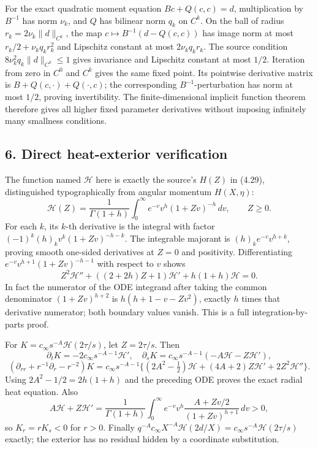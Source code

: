 \documentclass[10pt,a4paper]{article}
\begin{document}
For the exact quadratic moment equation \(Bc+Q(c,c)=d\), multiplication by \(B^{-1}\) has norm \(\nu_k\), and \(Q\) has bilinear norm \(q_k\) on \(C^k\). On the ball of radius \(r_k=2\nu_k\|d\|_{C^k}\), the map \(c\mapsto B^{-1}(d-Q(c,c))\) has image norm at most \(r_k/2+\nu_kq_kr_k^2\) and Lipschitz constant at most \(2\nu_kq_kr_k\). The source condition \(8\nu_k^2q_k\|d\|_{C^k}\le1\) gives invariance and Lipschitz constant at most \(1/2\). Iteration from zero in \(C^0\) and \(C^k\) gives the same fixed point. Its pointwise derivative matrix is \(B+Q(c,\cdot)+Q(\cdot,c)\); the corresponding \(B^{-1}\)-perturbation has norm at most \(1/2\), proving invertibility. The finite-dimensional implicit function theorem therefore gives all higher fixed parameter derivatives without imposing infinitely many smallness conditions.

\subsection{6. Direct heat-exterior verification}

The function named \(\mathcal H\) here is exactly the source's \(H(Z)\) in (4.29), distinguished typographically from angular momentum \(H(X,\eta)\):
\[
\mathcal H(Z)=\frac1{\Gamma(1+h)}\int_0^\infty e^{-v}v^h(1+Zv)^{-h}\,dv,
\qquad Z\ge0.
\]
For each \(k\), its \(k\)-th derivative is the integral with factor \((-1)^k(h)_kv^k(1+Zv)^{-h-k}\). The integrable majorant is \((h)_ke^{-v}v^{h+k}\), proving smooth one-sided derivatives at \(Z=0\) and positivity. Differentiating
\(e^{-v}v^{h+1}(1+Zv)^{-h-1}\) with respect to \(v\) shows
\[
Z^2\mathcal H''+((2+2h)Z+1)\mathcal H'+h(1+h)\mathcal H=0.
\]
In fact the numerator of the ODE integrand after taking the common denominator \((1+Zv)^{h+2}\) is \(h(h+1-v-Zv^2)\), exactly \(h\) times that derivative numerator; both boundary values vanish. This is a full integration-by-parts proof.

For \(K=c_\infty s^{-A}\mathcal H(2\tau/s)\), let \(Z=2\tau/s\). Then
\[
\partial_tK=-2c_\infty s^{-A-1}\mathcal H',\quad
\partial_sK=c_\infty s^{-A-1}(-A\mathcal H-Z\mathcal H'),
\]
\[
(\partial_{rr}+r^{-1}\partial_r-r^{-2})K
=c_\infty s^{-A-1}\{(2A^2-\tfrac12)\mathcal H
+(4A+2)Z\mathcal H'+2Z^2\mathcal H''\}.
\]
Using \(2A^2-1/2=2h(1+h)\) and the preceding ODE proves the exact radial heat equation. Also
\[
A\mathcal H+Z\mathcal H'
=\frac1{\Gamma(1+h)}\int_0^\infty e^{-v}v^h
\frac{A+Zv/2}{(1+Zv)^{h+1}}\,dv>0,
\]
so \(K_r=rK_s<0\) for \(r>0\). Finally
\(q^{-A}c_\infty X^{-A}\mathcal H(2d/X)=c_\infty s^{-A}\mathcal H(2\tau/s)\) exactly; the exterior has no residual hidden by a coordinate substitution.
\end{document}
